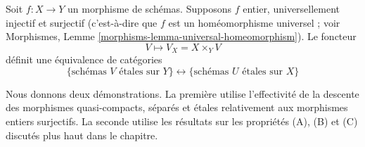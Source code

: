 \begin{theorem}
\label{theorem-topological-invariance}
\begin{reference}
\cite[IV Theorem 18.1.2]{EGA}
\end{reference}
Soit $f : X \to Y$ un morphisme de sch\'emas.
Supposons $f$ entier, universellement injectif et surjectif
(c'est-\`a-dire que $f$ est un hom\'eomorphisme universel ; voir
Morphismes, Lemme \ref{morphisms-lemma-universal-homeomorphism}).
Le foncteur
$$
V \longmapsto V_X = X \times_Y V
$$
d\'efinit une \'equivalence de cat\'egories
$$
\{
\text{sch\'emas }V\text{ \'etales sur }Y
\}
\leftrightarrow
\{
\text{sch\'emas }U\text{ \'etales sur }X
\}
$$
\end{theorem}

\noindent
Nous donnons deux d\'emonstrations. La premi\`ere utilise l'effectivit\'e de la descente
des morphismes quasi-compacts, s\'epar\'es et \'etales relativement
aux morphismes entiers surjectifs. La seconde utilise les r\'esultats
sur les propri\'et\'es (A), (B) et (C) discut\'es plus haut dans le chapitre.

